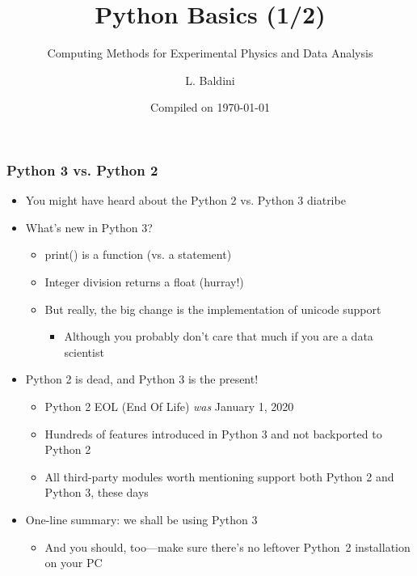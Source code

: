 \documentclass[9pt]{beamer}
\title{Python Basics (1/2)}
\subtitle{Computing Methods for Experimental Physics and Data Analysis}
\date{Compiled on \today}
\author{L. Baldini}
\institute[UNIPI and INFN]{Universit\`a and INFN--Pisa}
\begin{document}
\titleframe

\begin{frame}
  \frametitle{Python 3 vs. Python 2}
  \begin{itemize}
  \item You might have heard about the Python 2 vs. Python 3 diatribe
  \item What's new in Python 3?
    \begin{itemize}
    \item print() is a function (vs. a statement)
    \item Integer division returns a float (hurray!)
    \item But really, \alert{the big change is the implementation of
      unicode support}
      \begin{itemize}
      \item Although you probably don't care that much if you are a data
        scientist
      \end{itemize}
    \end{itemize}
  \item Python 2 is dead, and Python 3 is the present!
    \begin{itemize}
    \item Python 2 EOL (End Of Life) \emph{was} January 1, 2020
    \item Hundreds of features introduced in Python 3 and not backported to
      Python 2
    \item All third-party modules worth mentioning support both Python 2 and
      Python 3, these days
    \end{itemize}
  \item \alert{One-line summary: we shall be using Python 3}
  \begin{itemize}
    \item And you should, too---make sure there's no leftover Python~2
      installation on your PC
  \end{itemize}
  \end{itemize}
\end{frame}
\end{document}

